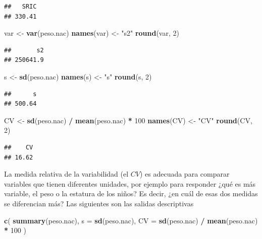 \documentclass[]{book}
\newenvironment{Shaded}{\begin{snugshade}}{\end{snugshade}}
\newcommand{\DataTypeTok}[1]{\textcolor[rgb]{0.13,0.29,0.53}{#1}}
\newcommand{\DecValTok}[1]{\textcolor[rgb]{0.00,0.00,0.81}{#1}}
\newcommand{\KeywordTok}[1]{\textcolor[rgb]{0.13,0.29,0.53}{\textbf{#1}}}
\newcommand{\NormalTok}[1]{#1}
\newcommand{\OperatorTok}[1]{\textcolor[rgb]{0.81,0.36,0.00}{\textbf{#1}}}
\newcommand{\StringTok}[1]{\textcolor[rgb]{0.31,0.60,0.02}{#1}}
\begin{document}
\begin{verbatim}
##   SRIC 
## 330.41
\end{verbatim}

\begin{Shaded}
\begin{Highlighting}[]
\NormalTok{var <-}\StringTok{ }\KeywordTok{var}\NormalTok{(peso.nac)}
\KeywordTok{names}\NormalTok{(var) <-}\StringTok{ "s2"}
\KeywordTok{round}\NormalTok{(var, }\DecValTok{2}\NormalTok{)}
\end{Highlighting}
\end{Shaded}

\begin{verbatim}
##       s2 
## 250641.9
\end{verbatim}

\begin{Shaded}
\begin{Highlighting}[]
\NormalTok{s <-}\StringTok{ }\KeywordTok{sd}\NormalTok{(peso.nac)}
\KeywordTok{names}\NormalTok{(s) <-}\StringTok{ "s"}
\KeywordTok{round}\NormalTok{(s, }\DecValTok{2}\NormalTok{)}
\end{Highlighting}
\end{Shaded}

\begin{verbatim}
##      s 
## 500.64
\end{verbatim}

\begin{Shaded}
\begin{Highlighting}[]
\NormalTok{CV <-}\StringTok{ }\KeywordTok{sd}\NormalTok{(peso.nac) }\OperatorTok{/}\StringTok{ }\KeywordTok{mean}\NormalTok{(peso.nac) }\OperatorTok{*}\StringTok{ }\DecValTok{100}
\KeywordTok{names}\NormalTok{(CV) <-}\StringTok{ "CV"}
\KeywordTok{round}\NormalTok{(CV, }\DecValTok{2}\NormalTok{)}
\end{Highlighting}
\end{Shaded}

\begin{verbatim}
##    CV 
## 16.62
\end{verbatim}

La medida relativa de la variabilidad (el \(CV\)) es adecuada para comparar variables que tienen diferentes unidades, por ejemplo para responder ¿qué es más variable, el peso o la estatura de los niños? Es decir, ¿en cuál de esas dos medidas se diferencian más? Las siguientes son las salidas descriptivas

\begin{Shaded}
\begin{Highlighting}[]
\KeywordTok{c}\NormalTok{(}
  \KeywordTok{summary}\NormalTok{(peso.nac),}
  \DataTypeTok{s =} \KeywordTok{sd}\NormalTok{(peso.nac),}
  \DataTypeTok{CV =} \KeywordTok{sd}\NormalTok{(peso.nac) }\OperatorTok{/}\StringTok{ }\KeywordTok{mean}\NormalTok{(peso.nac) }\OperatorTok{*}\StringTok{ }\DecValTok{100}
\NormalTok{)}
\end{Highlighting}
\end{Shaded}
\end{document}
